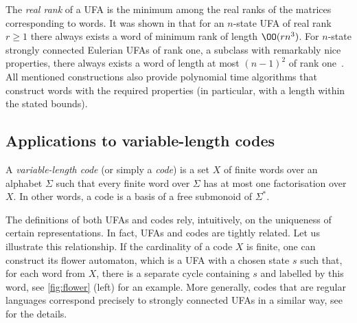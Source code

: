 The \emph{real rank} of a UFA is the minimum among the real ranks of the matrices corresponding to words. It was shown in \cite{Carpi1988} that for an $n$-state UFA of real rank $r \ge 1$ there always exists a word of minimum rank of length $\OO(rn^3)$.
For $n$-state strongly connected Eulerian UFAs of rank one, a subclass with remarkably nice properties, there always exists a word of length at most $(n - 1)^2$ of rank one~\cite[Corollary~4]{Carpi2009}. All mentioned constructions also provide polynomial time algorithms that construct words with the required properties (in particular, with a length within the stated bounds).

\subsection{Applications to variable-length codes}\label{subs:var-length-codes}

A \emph{variable-length code} (or simply a \emph{code}) is a set $X$ of finite words over an alphabet $\Sigma$ such that every finite word over $\Sigma$ has at most one factorisation over $X$. In other words, a code is a basis of a free submonoid of $\Sigma^*$. 

The definitions of both UFAs and codes rely, intuitively, on the uniqueness of certain representations. In fact, UFAs and codes are tightly related. Let us illustrate this relationship.
If the cardinality of a code $X$ is finite, one can construct its flower automaton, which is a UFA with a chosen state $s$ such that, for each word from $X$, there is a separate cycle containing $s$ and labelled by this word, see \autoref{fig:flower} (left) for an example.
More generally, codes that are regular languages correspond precisely to strongly connected UFAs in a similar way, see \cite[Chapter 4]{Berstel2010} for the details.

